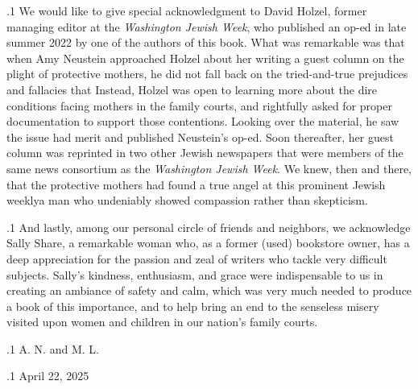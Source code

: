 \documentclass[11pt, twoside]{article}
\begin{document}
{\p.1{%
We would like to give special acknowledgment to David Holzel,
former managing editor at the \textit{Washington Jewish Week}, who published an
op-ed in late summer 2022 by one of the authors of this book. What
was remarkable was that when Amy Neustein approached Holzel about
her writing a guest column on the plight of protective mothers, he did not
fall back on the tried-and-true prejudices and fallacies that  Instead, Holzel was open to learning more about the dire conditions facing mothers in the family courts, and rightfully asked for proper
documentation to support those contentions. Looking over the material, he saw the issue had merit and published Neustein’s op-ed. Soon
thereafter, her guest column was reprinted in two other Jewish newspapers that were members of the same news consortium as the \textit{Washington Jewish Week}.
We knew, then and there, that the protective mothers
had found a true angel at this prominent Jewish weekly\mdash{}a man who
undeniably showed compassion rather than skepticism.
}%

\p.1{%
And lastly, among our personal circle of friends and neighbors, we
acknowledge Sally Share, a remarkable woman who, as a former (used)
bookstore owner, has a deep appreciation for the passion and zeal of
writers who tackle very difficult subjects. Sally’s kindness, enthusiasm,
and grace were indispensable to us in creating an ambiance of safety
and calm, which was very much needed to produce a book of this importance, and to help bring an end to the senseless misery visited upon
women and children in our nation’s family courts.
}%

\p.1{%
\hfill{}A. N. and M. L.
}%

\p.1{%
\hfill{}April 22, 2025
}%





}
\end{document}
